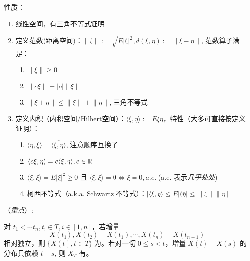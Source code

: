 性质：
\begin{enumerate}
	\item 线性空间，有三角不等式证明
	\item 定义范数(距离空间)：$\lVert \xi\rVert := \sqrt{E|\xi|^2}, d(\xi,\eta) := \lVert \xi - \eta \rVert$, 范数算子满足：
	\begin{enumerate}
		\item $\lVert\xi\rVert \ge 0$
		\item $\lVert c\xi \rVert= |c|\lVert \xi \rVert$
		\item $\lVert \xi + \eta \rVert \le \lVert \xi \rVert + \lVert \eta \rVert$, 三角不等式
	\end{enumerate}
	\item 定义内积（内积空间/Hilbert空间）：$\langle\xi,\eta\rangle := E\xi\overline{\eta}$，特性（大多可直接按定义证明）：
	\begin{enumerate}
		\item $\langle\eta,\xi\rangle = \overline{\langle\xi,\eta\rangle}$, 注意顺序互换了
		\item $\langle c\xi, \eta\rangle = c\langle\xi,\eta\rangle, c \in \mathbb{R}$
		\item $\langle\xi,\xi\rangle = E|\xi|^2\ge0$ 且 $\langle \xi, \xi \rangle = 0 \Leftrightarrow \xi = 0, a.e.$ (a.e. 表示\emph{几乎处处})
		\item 柯西不等式（a.k.a. Schwartz 不等式）：$|\langle \xi, \eta\rangle \le E|\xi\overline{\eta}| \le \lVert\xi\rVert\lVert\eta\rVert$
	\end{enumerate}
\end{enumerate}


（\emph{重点}）:


对 $t_1 < \cdots t_n, t_i \in T, i \in [1, n]$，若增量
\begin{equation}
	X(t_1), X(t_2) - X(t_1), \cdots, X(t_n) - X(t_{n-1})
\end{equation}
相对独立，则 $\{X(t), t\in T\}$ 为。若对一切 $0 \le s < t$，增量 $X(t) - X(s)$ 的分布只依赖 $t-s$, 则 $X_T$ 有。